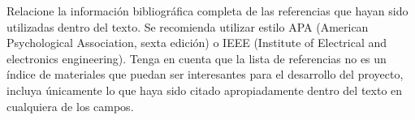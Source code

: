 \documentclass[../Main.tex]{subfiles}
\begin{document}
Relacione la información bibliográfica completa de las referencias que hayan sido utilizadas dentro
del texto. Se recomienda utilizar estilo APA (American Psychological Association, sexta edición) o
IEEE (Institute of Electrical and electronics engineering). Tenga en cuenta que la lista de
referencias no es un índice de materiales que puedan ser interesantes para el desarrollo del proyecto,
incluya únicamente lo que haya sido citado apropiadamente dentro del texto en cualquiera de
los campos.
\end{document}
